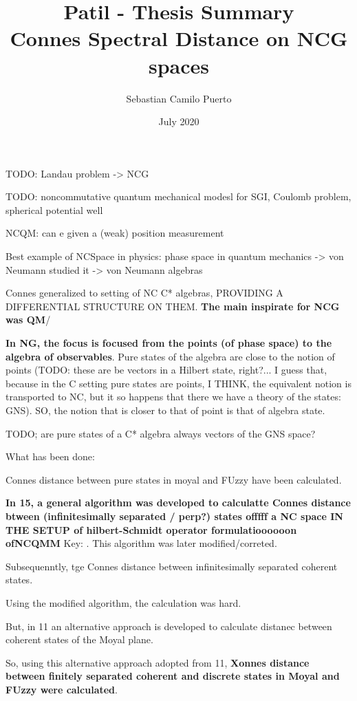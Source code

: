 \documentclass{article}
\title{Patil - Thesis Summary\\Connes Spectral Distance on NCG spaces}
\author{Sebastian Camilo Puerto}
\date{July 2020}
\begin{document}
\maketitle

\tableofcontents
TODO: Landau problem -> NCG

TODO: noncommutative quantum mechanical modesl for SGI, Coulomb problem, spherical potential well

NCQM: can e given a (weak) position measurement

Best example of NCSpace in physics: phase space in quantum mechanics -> von Neumann studied it -> von Neumann algebras

Connes generalized to setting of NC C* algebras, PROVIDING A DIFFERENTIAL STRUCTURE ON THEM.
\textbf{The main inspirate for NCG was QM}/

\textbf{In NG, the focus is focused from the points (of phase space) to the algebra of observables}. Pure states of the algebra are close to the notion of points (TODO: these are be vectors in a Hilbert state, right?... I guess that, because in the C setting pure states are points, I THINK, the equivalent notion is transported to NC, but it so happens that there we have a theory of the states: GNS). SO, the notion that is closer to that of point is that of algebra state.

TODO; are pure states of a C* algebra always vectors of the GNS space?

What has been done:

Connes distance between pure states in moyal and FUzzy have been calculated.

\textbf{In 15, a general algorithm was developed to calculatte Connes distance btween (infinitesimally separated / perp?) states offfff a NC space IN THE SETUP of hilbert-Schmidt operator formulatioooooon ofNCQMM} Key: . This algorithm was later modified/correted.

Subsequenntly, tge Connes distance between infinitesimally separated coherent states.

Using the modified algorithm, the calculation was hard.

But, in 11 an alternative approach is developed to calculate distanec between coherent states of the Moyal plane.

So, using this alternative approach adopted from 11, \textbf{Xonnes distance between finitely separated coherent and discrete states in Moyal and FUzzy were calculated}.
\end{document}
